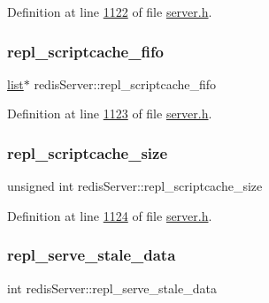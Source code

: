 Definition at line \hyperlink{server_8h_source_l01122}{1122} of file \hyperlink{server_8h_source}{server.\+h}.

\mbox{\label{structredisServer_a09255fe8de766f27551ffcf0c58a0840}} 
\subsubsection{\texorpdfstring{repl\+\_\+scriptcache\+\_\+fifo}{repl\_scriptcache\_fifo}}
{\footnotesize\ttfamily \hyperlink{structlist}{list}$\ast$ redis\+Server\+::repl\+\_\+scriptcache\+\_\+fifo}



Definition at line \hyperlink{server_8h_source_l01123}{1123} of file \hyperlink{server_8h_source}{server.\+h}.

\mbox{\label{structredisServer_aca00ac6e60fb4fe0656391306daa1c02}} 
\subsubsection{\texorpdfstring{repl\+\_\+scriptcache\+\_\+size}{repl\_scriptcache\_size}}
{\footnotesize\ttfamily unsigned int redis\+Server\+::repl\+\_\+scriptcache\+\_\+size}



Definition at line \hyperlink{server_8h_source_l01124}{1124} of file \hyperlink{server_8h_source}{server.\+h}.

\mbox{\label{structredisServer_a7e0d0f265c5394e6f19be48bb538ebcc}} 
\subsubsection{\texorpdfstring{repl\+\_\+serve\+\_\+stale\+\_\+data}{repl\_serve\_stale\_data}}
{\footnotesize\ttfamily int redis\+Server\+::repl\+\_\+serve\+\_\+stale\+\_\+data}



